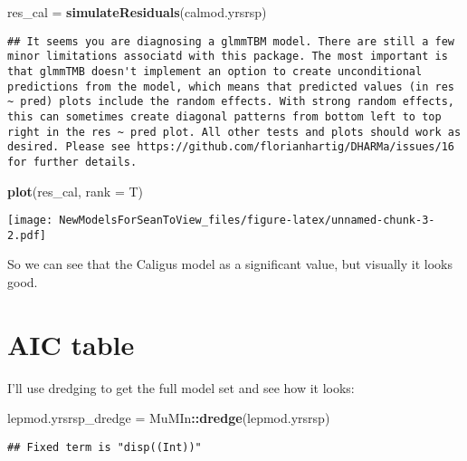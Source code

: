 \documentclass[]{article}
\newenvironment{Shaded}{\begin{snugshade}}{\end{snugshade}}
\newcommand{\KeywordTok}[1]{\textcolor[rgb]{0.13,0.29,0.53}{\textbf{#1}}}
\newcommand{\DataTypeTok}[1]{\textcolor[rgb]{0.13,0.29,0.53}{#1}}
\newcommand{\StringTok}[1]{\textcolor[rgb]{0.31,0.60,0.02}{#1}}
\newcommand{\OperatorTok}[1]{\textcolor[rgb]{0.81,0.36,0.00}{\textbf{#1}}}
\newcommand{\NormalTok}[1]{#1}
\begin{document}
\begin{Shaded}
\begin{Highlighting}[]
\NormalTok{res_cal =}\StringTok{ }\KeywordTok{simulateResiduals}\NormalTok{(calmod.yrsrsp)}
\end{Highlighting}
\end{Shaded}

\begin{verbatim}
## It seems you are diagnosing a glmmTBM model. There are still a few minor limitations associatd with this package. The most important is that glmmTMB doesn't implement an option to create unconditional predictions from the model, which means that predicted values (in res ~ pred) plots include the random effects. With strong random effects, this can sometimes create diagonal patterns from bottom left to top right in the res ~ pred plot. All other tests and plots should work as desired. Please see https://github.com/florianhartig/DHARMa/issues/16 for further details.
\end{verbatim}

\begin{Shaded}
\begin{Highlighting}[]
\KeywordTok{plot}\NormalTok{(res_cal, }\DataTypeTok{rank =}\NormalTok{ T)}
\end{Highlighting}
\end{Shaded}

\texttt{[image: NewModelsForSeanToView\_files/figure-latex/unnamed-chunk-3-2.pdf]}

So we can see that the Caligus model as a significant value, but
visually it looks good.

\section{AIC table}\label{aic-table}

I'll use dredging to get the full model set and see how it looks:

\begin{Shaded}
\begin{Highlighting}[]
\NormalTok{lepmod.yrsrsp_dredge =}\StringTok{ }\NormalTok{MuMIn}\OperatorTok{::}\KeywordTok{dredge}\NormalTok{(lepmod.yrsrsp)}
\end{Highlighting}
\end{Shaded}

\begin{verbatim}
## Fixed term is "disp((Int))"
\end{verbatim}
\end{document}
